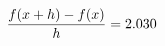 \documentclass[preview]{standalone}
\begin{document}
\begin{align*}
\special{dvisvgm:raw <g id='unique000'>}\frac{f(x+h)-f(x)}{h} = 2.030\special{dvisvgm:raw </g>}
\end{align*}
\end{document}
